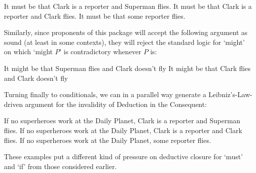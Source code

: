 \documentclass[If.tex]{subfiles}
\begin{document}
\begin{prop}
	\nitem
	\begin{prop}
		\aitem \label{must2}
		It must be that Clark is a reporter and Superman flies.
		\aitem \label{must3}
		It must be that Clark is a reporter and Clark flies.
		\aitem \label{must5}
		It must be that some reporter flies.
	\end{prop}
\end{prop}
Similarly, since proponents of this package will accept the following argument as sound (at least in some contexts), they will reject the standard logic for ‘might’ on which ‘might $P$’ is contradictory whenever $P$ is:
\begin{prop}
	\nitem	
	\begin{prop}
		\aitem
		It might be that Superman flies and Clark doesn't fly
		\aitem
		It might be that Clark flies and Clark doesn't fly
	\end{prop}
\end{prop}
Turning finally to conditionals, we can in a parallel way generate a Leibniz's-Law-driven argument for the invalidity of Deduction in the Consequent:
\begin{prop}
	\nitem
	\begin{prop}
		\aitem \label{if2}
		If no superheroes work at the Daily Planet, Clark is a reporter and Superman flies.
		\aitem \label{if3}
		If no superheroes work at the Daily Planet, Clark is a reporter and Clark flies.
		\aitem \label{if5}
		If no superheroes work at the Daily Planet, some reporter flies.
	\end{prop}
\end{prop}
These examples put a different kind of pressure on deductive closure for ‘must’ and ‘if’ from those considered earlier.  
\end{document}
